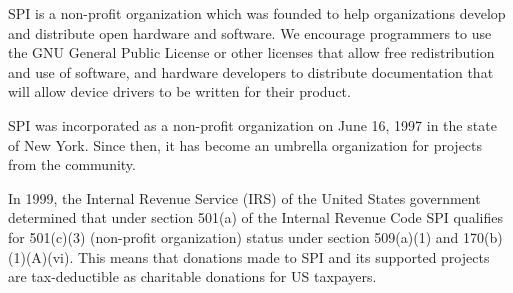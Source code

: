 \documentclass[a4paper]{report}
\begin{document}
SPI is a non-profit organization which was founded to help organizations develop and distribute open hardware and software. We encourage programmers to use the GNU General Public License or other licenses that allow free redistribution and use of software, and hardware developers to distribute documentation that will allow device drivers to be written for their product.

SPI was incorporated as a non-profit organization on June 16, 1997 in the state of New York. Since then, it has become an umbrella organization for projects from the community.

In 1999, the Internal Revenue Service (IRS) of the United States government determined that under section 501(a) of the Internal Revenue Code SPI qualifies for 501(c)(3) (non-profit organization) status under section 509(a)(1) and 170(b)(1)(A)(vi). This means that donations made to SPI and its supported projects are tax-deductible as charitable donations for US taxpayers.

\newpage

\pagestyle{empty}


\null
\end{document}
